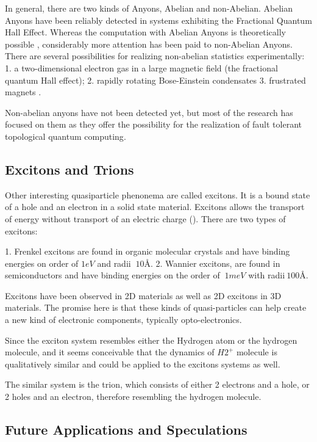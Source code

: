 In general, there are two kinds of Anyons, Abelian and non-Abelian. Abelian Anyons have been reliably detected in systems exhibiting the Fractional Quantum Hall Effect\cite{FQHE}.  Whereas the computation with Abelian Anyons is theoretically possible \cite{AbelianAnyons}, considerably more attention has been paid to non-Abelian Anyons.
There are several possibilities for realizing non-abelian statistics experimentally: 1. a two-dimensional electron gas in a large magnetic field (the fractional quantum Hall effect); 2. rapidly rotating Bose-Einstein condensates\cite{RrBeC} 3. frustrated magnets \cite{FrMag}.

Non-abelian anyons have not been detected yet, but most of the research has focused on them as they offer the possibility 
for the realization of fault tolerant topological quantum computing\cite{AnyonsTqc}. 

\subsection*{Excitons and Trions}
Other interesting quasiparticle phenonema are called excitons\cite{Excitons2D1}. It is a bound state of a hole and an electron in a solid state material. Excitons allows the transport of energy without transport of an electric charge (). There are two types of excitons: 

1. Frenkel excitons are found in organic molecular crystals\cite{Excitons3} and have binding energies on
order of $ 1eV $ and radii $ ~ 10\text{\AA} $.  
2. Wannier excitons, are found in semiconductors\cite{Excitons2} and have binding energies on the order of $ ~1 meV $ with radii$ ~100\text{\AA}. $

Excitons have been observed in 2D materials\cite{Excitons2D2} as
well as 2D excitons in 3D materials. The promise here is that these kinds of quasi-particles can help create a new kind of electronic components, typically opto-electronics.

Since the exciton system resembles either the Hydrogen atom or the hydrogen molecule, and it seems conceivable that the dynamics of  $ H2^{+} $ molecule is qualitatively similar and could be applied to the excitons systems as well.

The similar system is the trion, which consists of either 2 electrons and a hole, or 2 holes and an electron, therefore resembling the hydrogen molecule. 

\subsection*{Future Applications and Speculations}

